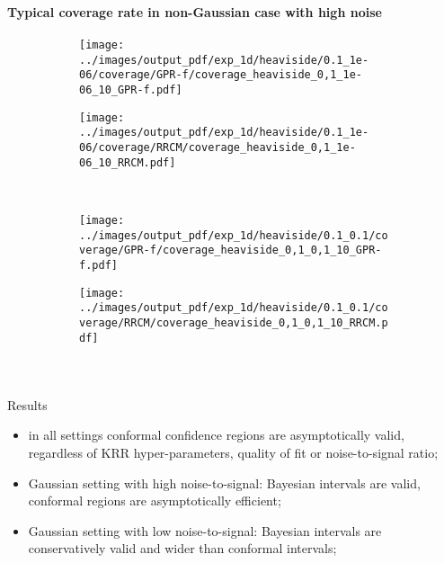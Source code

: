 \documentclass[t]{beamer}  %
\begin{document}
\begin{frame}[t]\frametitle{\insertsection}
  \framesubtitle{Typical coverage rate in non-Gaussian case with high noise}
  \begin{figure}%
    \centering
    \begin{subfigure}[b]{0.45\linewidth}
      \texttt{[image: ../images/output\_pdf/exp\_1d/heaviside/0.1\_1e-06/coverage/GPR-f/coverage\_heaviside\_0,1\_1e-06\_10\_GPR-f.pdf]}
    \end{subfigure}%
    \begin{subfigure}[b]{0.45\linewidth}
      \texttt{[image: ../images/output\_pdf/exp\_1d/heaviside/0.1\_1e-06/coverage/RRCM/coverage\_heaviside\_0,1\_1e-06\_10\_RRCM.pdf]}
    \end{subfigure}\\
    \begin{subfigure}[b]{0.45\linewidth}
      \texttt{[image: ../images/output\_pdf/exp\_1d/heaviside/0.1\_0.1/coverage/GPR-f/coverage\_heaviside\_0,1\_0,1\_10\_GPR-f.pdf]}
    \end{subfigure}%
    \begin{subfigure}[b]{0.45\linewidth}
      \texttt{[image: ../images/output\_pdf/exp\_1d/heaviside/0.1\_0.1/coverage/RRCM/coverage\_heaviside\_0,1\_0,1\_10\_RRCM.pdf]}
    \end{subfigure}\\
  \end{figure}
\end{frame}

\begin{frame}[c]\frametitle{\insertsection}
  \framesubtitle{\insertsubsection}
  \begin{block}{Results}
    \begin{itemize}
      \item in all settings conformal confidence regions are asymptotically valid,
      regardless of KRR hyper-parameters, quality of fit or noise-to-signal ratio;
      \vspace{\baselineskip}
      \item Gaussian setting with high noise-to-signal: Bayesian intervals are valid,
      conformal regions are asymptotically efficient;
      \vspace{\baselineskip}
      \item Gaussian setting with low noise-to-signal: Bayesian intervals are
      conservatively valid and wider than conformal intervals;
    \end{itemize}
  \end{block}
\end{frame}
\end{document}
